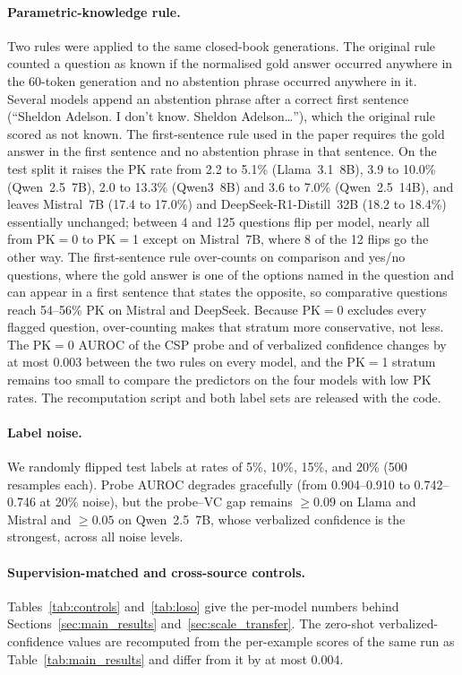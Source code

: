 \documentclass[acmsmall,screen,review]{acmart}
\begin{document}
\paragraph{Parametric-knowledge rule.}
Two rules were applied to the same closed-book generations. The original rule counted a question as known if the normalised gold answer occurred anywhere in the 60-token generation and no abstention phrase occurred anywhere in it. Several models append an abstention phrase after a correct first sentence (``Sheldon Adelson. I don't know. Sheldon Adelson\ldots''), which the original rule scored as not known. The first-sentence rule used in the paper requires the gold answer in the first sentence and no abstention phrase in that sentence. On the test split it raises the PK rate from 2.2 to 5.1\% (Llama~3.1~8B), 3.9 to 10.0\% (Qwen~2.5~7B), 2.0 to 13.3\% (Qwen3~8B) and 3.6 to 7.0\% (Qwen~2.5~14B), and leaves Mistral~7B (17.4 to 17.0\%) and DeepSeek-R1-Distill~32B (18.2 to 18.4\%) essentially unchanged; between 4 and 125 questions flip per model, nearly all from PK$=$0 to PK$=$1 except on Mistral~7B, where 8 of the 12 flips go the other way. The first-sentence rule over-counts on comparison and yes/no questions, where the gold answer is one of the options named in the question and can appear in a first sentence that states the opposite, so comparative questions reach 54--56\% PK on Mistral and DeepSeek. Because PK$=$0 excludes every flagged question, over-counting makes that stratum more conservative, not less. The PK$=$0 AUROC of the CSP probe and of verbalized confidence changes by at most 0.003 between the two rules on every model, and the PK$=$1 stratum remains too small to compare the predictors on the four models with low PK rates. The recomputation script and both label sets are released with the code.

\label{sec:robustness}

\paragraph{Label noise.}
We randomly flipped test labels at rates of 5\%, 10\%, 15\%, and 20\% (500 resamples each). Probe AUROC degrades gracefully (from 0.904--0.910 to 0.742--0.746 at 20\% noise), but the probe--VC gap remains $\geq 0.09$ on Llama and Mistral and $\geq 0.05$ on Qwen~2.5~7B, whose verbalized confidence is the strongest, across all noise levels.

\paragraph{Supervision-matched and cross-source controls.}
Tables~\ref{tab:controls} and~\ref{tab:loso} give the per-model numbers behind Sections~\ref{sec:main_results} and~\ref{sec:scale_transfer}. The zero-shot verbalized-confidence values are recomputed from the per-example scores of the same run as Table~\ref{tab:main_results} and differ from it by at most 0.004.
\end{document}
